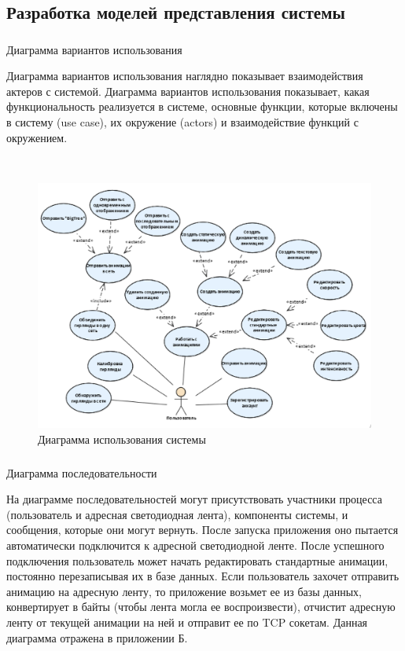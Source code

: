 \subsection{Разработка моделей представления системы}
\label{sec:develop:umlDiagrams}

\subsubsection{} Диаграмма вариантов использования
\label{sec:develop:umlDiagrams:useCase}

Диаграмма вариантов использования наглядно показывает взаимодействия актеров с системой. Диаграмма вариантов использования показывает, какая функциональность реализуется в системе, основные функции, которые включены в систему (use case), их окружение (actors) и взаимодействие функций с окружением.

~
\begin{figure}[H]
\centering
	\includegraphics[scale=0.65]{figures/diagrams/uml_useCase.png}
	\caption{Диаграмма использования системы}
	\label{fig:develop:umlDiagrams:useCase}
\end{figure}

\subsubsection{} Диаграмма последовательности
\label{sec:develop:umlDiagrams:sequence}

На диаграмме последовательностей могут присутствовать участники процесса (пользователь и адресная светодиодная лента), компоненты системы, и сообщения, которые они могут вернуть. После запуска приложения оно пытается автоматически подключится к адресной светодиодной ленте. После успешного подключения пользователь может начать редактировать стандартные анимации, постоянно перезаписывая их в базе данных. Если пользователь захочет отправить анимацию на адресную ленту, то приложение возьмет ее из базы данных, конвертирует в байты (чтобы лента могла ее воспроизвести), отчистит адресную ленту от текущей анимации на ней и отправит ее по TCP сокетам. Данная диаграмма отражена в приложении Б.

